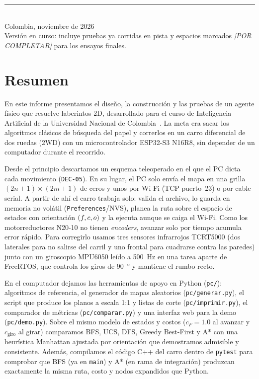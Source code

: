 \begin{titlepage}
  \vfill

  {\color{grisborde}\rule{0.7\textwidth}{0.6pt}}\\[0.3cm]
  {\normalsize\color{gristexto} Colombia, noviembre de 2026}\\[0.1cm]
  {\footnotesize\color{gristexto} Versión en curso: incluye pruebas ya corridas en pista y espacios marcados \emph{[POR COMPLETAR]} para los ensayos finales.}
\end{titlepage}

\clearpage
\thispagestyle{empty}
\section*{Resumen}

En este informe presentamos el diseño, la construcción y las pruebas de un agente físico que resuelve laberintos 2D, desarrollado para el curso de Inteligencia Artificial de la Universidad Nacional de Colombia~\cite{repo2026agentelaberinto,excel2026organizacion}. La meta era sacar los algoritmos clásicos de búsqueda del papel y correrlos en un carro diferencial de dos ruedas (2WD) con un microcontrolador ESP32-S3 N16R8, sin depender de un computador durante el recorrido.

Desde el principio descartamos un esquema teleoperado en el que el PC dicta cada movimiento (\texttt{DEC-05}). En su lugar, el PC solo envía el mapa en una grilla $(2n+1)\times(2m+1)$ de ceros y unos por Wi-Fi (TCP puerto~23) o por cable serial. A partir de ahí el carro trabaja solo: valida el archivo, lo guarda en memoria no volátil (\texttt{Preferences}/NVS), planea la ruta sobre el espacio de estados con orientación $(f,c,o)$ y la ejecuta aunque se caiga el Wi-Fi. Como los motorreductores N20-10 no tienen \emph{encoders}, avanzar solo por tiempo acumula error rápido. Para corregirlo usamos tres sensores infrarrojos TCRT5000 (dos laterales para no salirse del carril y uno frontal para cuadrarse contra las paredes) junto con un giroscopio MPU6050 leído a \SI{500}{\hertz} en una tarea aparte de FreeRTOS, que controla los giros de \SI{90}{\degree} y mantiene el rumbo recto.

En el computador dejamos las herramientas de apoyo en Python (\texttt{pc/}): algoritmos de referencia, el generador de mapas aleatorios (\texttt{pc/generar.py}), el script que produce los planos a escala 1:1 y listas de corte (\texttt{pc/imprimir.py}), el comparador de métricas (\texttt{pc/comparar.py}) y una interfaz web para la demo (\texttt{pc/demo.py}). Sobre el mismo modelo de estados y costos ($c_F = 1.0$ al avanzar y $c_{\text{giro}}$ al girar) comparamos BFS, UCS, DFS, Greedy Best-First y A* con una heurística Manhattan ajustada por orientación que demostramos admisible y consistente. Además, compilamos el código C++ del carro dentro de \texttt{pytest} para comprobar que BFS (ya en \texttt{main}) y A* (en rama de integración) produzcan exactamente la misma ruta, costo y nodos expandidos que Python.

